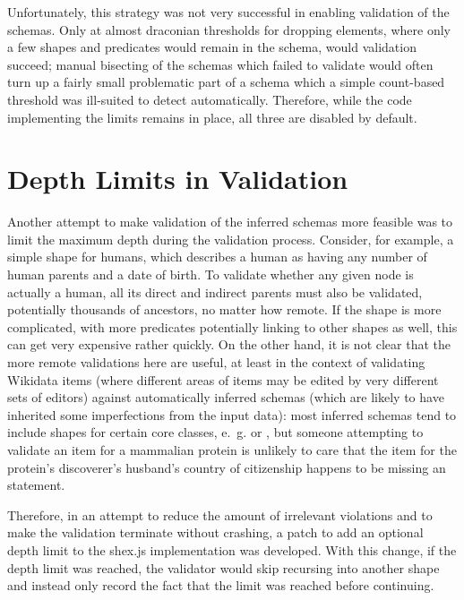 Unfortunately, this strategy was not very successful in enabling validation of the \glspl{schema}.
Only at almost draconian thresholds for dropping elements,
where only a few \glspl{shape} and \glspl{predicate} would remain in the \gls{schema},
would validation succeed;
manual bisecting of the \glspl{schema} which failed to validate
would often turn up a fairly small problematic part of a \gls{schema}
which a simple count-based threshold was ill-suited to detect automatically.
Therefore, while the code implementing the limits remains in place,
all three are disabled by default.

\section{Depth Limits in Validation}
\label{sec:RDF2Graph+Wikidata:depth-limit}

Another attempt to make validation of the inferred \glspl{schema} more feasible
was to limit the maximum depth during the validation process.
Consider, for example, a simple \gls{shape} for humans,
which describes a human as having any number of human parents and a date of birth.
To validate whether any given node is actually a human,
all its direct and indirect parents must also be validated,
potentially thousands of ancestors, no matter how remote.
If the \gls{shape} is more complicated,
with more predicates potentially linking to other \glspl{shape} as well,
this can get very expensive rather quickly.
On the other hand, it is not clear that the more remote validations here are useful,
at least in the context of validating \gls{Wikidata} \glspl{item}
(where different areas of \glspl{item} may be edited by very different sets of editors)
against automatically inferred \glspl{schema}
(which are likely to have inherited some imperfections from the input data):
most inferred \glspl{schema} tend to include \glspl{shape} for certain core classes,
e.~g.  or ,
but someone attempting to validate an \gls{item} for a mammalian protein
is unlikely to care that the \gls{item} for the protein’s discoverer’s husband’s country of citizenship
happens to be missing an  statement.

Therefore, in an attempt to reduce the amount of irrelevant violations
and to make the validation terminate without crashing,
a patch to add an optional depth limit to the \gls{shex.js} implementation was developed.
With this change, if the depth limit was reached,
the validator would skip recursing into another \gls{shape}
and instead only record the fact that the limit was reached before continuing.

